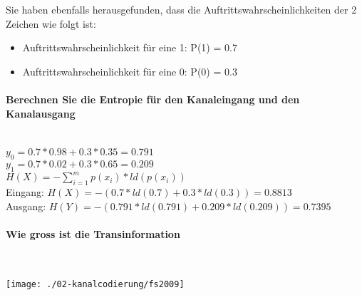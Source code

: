 Sie haben ebenfalls herausgefunden, dass die Auftrittswahrscheinlichkeiten der 2 Zeichen wie folgt ist:
\begin{itemize}
    \item Auftrittswahrscheinlichkeit für eine 1: P(1) = 0.7
    \item Auftrittswahrscheinlichkeit für eine 0: P(0) = 0.3
\end{itemize}

\paragraph{Berechnen Sie die Entropie für den Kanaleingang und den Kanalausgang}\mbox{}\\
$y_0=0.7*0.98+0.3*0.35=0.791$\\
$y_1=0.7*0.02+0.3*0.65=0.209$\\

$H(X)=-\sum_{i=1}^mp(x_i)*ld(p(x_i))$\\
Eingang: $H(X)=-(0.7*ld(0.7)+0.3*ld(0.3))=0.8813$\\
Ausgang: $H(Y)=-(0.791*ld(0.791)+0.209*ld(0.209))=0.7395$

\paragraph{Wie gross ist die Transinformation}\mbox{}\\
\begin{center}
    \vspace{-8pt}
    \texttt{[image: ./02-kanalcodierung/fs2009]}
    \vspace{-8pt}
\end{center}



